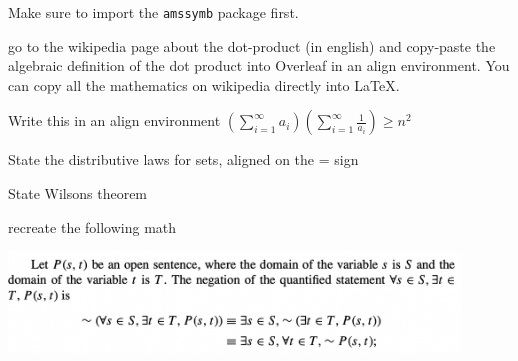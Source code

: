\documentclass[a4paper, 11pt]{article}
\begin{document}
\begin{compactenum}
Make sure to import the \texttt{amssymb} package first.
\item go to the wikipedia page about the dot-product (in english) and copy-paste the algebraic definition of the dot product into Overleaf in an align environment. You can copy all the mathematics on wikipedia directly into LaTeX.
\item Write this in an align environment $\left(\sum_{i=1}^\infty a_i\right)\left(\sum_{i=1}^\infty\frac{1}{a_i}\right)\geq n^2$
\item State the distributive laws for sets, aligned on the = sign
\item State Wilsons theorem
\item recreate the following math
\end{compactenum}
\includegraphics[width=0.9\textwidth]{plaatje.pdf}
\end{document}
